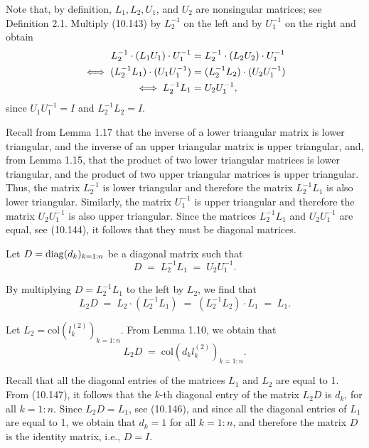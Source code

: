 
Note that, by definition, $L_1, L_2, U_1$, and $U_2$ are nonsingular matrices; see
Definition 2.1. Multiply (10.143) by $L_2^{-1}$ on the left and by $U_1^{-1}$ on the
right and obtain
\begin{align}
L_2^{-1}\cdot(L_1U_1)\cdot U_1^{-1} &= L_2^{-1}\cdot(L_2U_2)\cdot U_1^{-1} \notag \\
\iff (L_2^{-1}L_1)\cdot(U_1U_1^{-1}) &= (L_2^{-1}L_2)\cdot(U_2U_1^{-1}) \notag \\
\iff L_2^{-1}L_1 &= U_2U_1^{-1},
\end{align}
since $U_1U_1^{-1} = I$ and $L_2^{-1}L_2 = I$.

Recall from Lemma 1.17 that the inverse of a lower triangular matrix is lower
triangular, and the inverse of an upper triangular matrix is upper triangular, and,
from Lemma 1.15, that the product of two lower triangular matrices is lower
triangular, and the product of two upper triangular matrices is upper triangular.
Thus, the matrix $L_2^{-1}$ is lower triangular and therefore the matrix
$L_2^{-1}L_1$ is also lower triangular. Similarly, the matrix $U_1^{-1}$ is upper
triangular and therefore the matrix $U_2U_1^{-1}$ is also upper triangular. Since
the matrices $L_2^{-1}L_1$ and $U_2U_1^{-1}$ are equal, see (10.144), it follows
that they must be diagonal matrices.

Let $D = \operatorname{diag}(d_k)_{k=1:n}$ be a diagonal matrix such that
\begin{equation}
D \;=\; L_2^{-1}L_1 \;=\; U_2U_1^{-1}.
\end{equation}

By multiplying $D = L_2^{-1}L_1$ to the left by $L_2$, we find that
\begin{equation}
L_2D \;=\; L_2\cdot(L_2^{-1}L_1) \;=\; (L_2^{-1}L_2)\cdot L_1 \;=\; L_1.
\end{equation}

Let $L_2 = \mathrm{col}\left(l_k^{(2)}\right)_{k=1:n}$. From Lemma 1.10, we obtain
that
\begin{equation}
L_2D \;=\; \mathrm{col}\left(d_kl_k^{(2)}\right)_{k=1:n}.
\end{equation}

Recall that all the diagonal entries of the matrices $L_1$ and $L_2$ are equal to
1. From (10.147), it follows that the $k$-th diagonal entry of the matrix $L_2D$ is
$d_k$, for all $k=1:n$. Since $L_2D = L_1$, see (10.146), and since all the diagonal
entries of $L_1$ are equal to 1, we obtain that $d_k=1$ for all $k=1:n$, and
therefore the matrix $D$ is the identity matrix, i.e., $D = I$.

